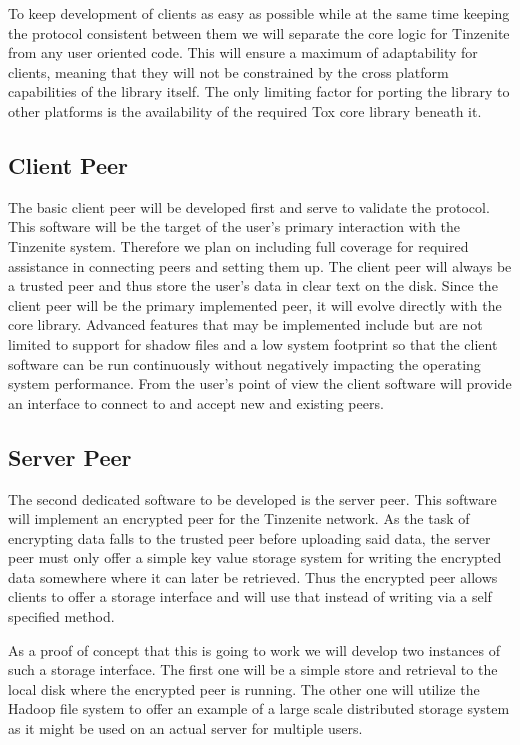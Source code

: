 To keep development of clients as easy as possible while at the same time keeping the protocol consistent between them we will separate the core logic for Tinzenite from any user oriented code.
This will ensure a maximum of adaptability for clients, meaning that they will not be constrained by the cross platform capabilities of the library itself.
The only limiting factor for porting the library to other platforms is the availability of the required Tox core library beneath it.

\subsection{Client Peer}

The basic client peer will be developed first and serve to validate the protocol.
This software will be the target of the user's primary interaction with the Tinzenite system.
Therefore we plan on including full coverage for required assistance in connecting peers and setting them up.
The client peer will always be a trusted peer and thus store the user's data in clear text on the disk.
Since the client peer will be the primary implemented peer, it will evolve directly with the core library.
Advanced features that may be implemented include but are not limited to support for shadow files and a low system footprint so that the client software can be run continuously without negatively impacting the operating system performance.
From the user's point of view the client software will provide an interface to connect to and accept new and existing peers.

\subsection{Server Peer}

The second dedicated software to be developed is the server peer.
This software will implement an encrypted peer for the Tinzenite network.
As the task of encrypting data falls to the trusted peer before uploading said data, the server peer must only offer a simple key value storage system for writing the encrypted data somewhere where it can later be retrieved.
Thus the encrypted peer allows clients to offer a storage interface and will use that instead of writing via a self specified method.

As a proof of concept that this is going to work we will develop two instances of such a storage interface.
The first one will be a simple store and retrieval to the local disk where the encrypted peer is running.
The other one will utilize the Hadoop file system to offer an example of a large scale distributed storage system as it might be used on an actual server for multiple users.

